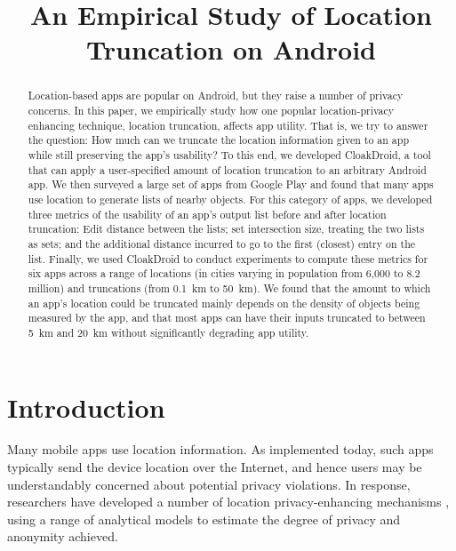\documentclass[10pt, conference, compsocconf]{IEEEtran}
\begin{document}
%

\title{An Empirical Study of Location Truncation on Android}
\author{
}

\maketitle

\begin{abstract}
  Location-based apps are popular on Android, but they raise a number
  of privacy concerns. In this paper, we empirically study how one
  popular location-privacy enhancing technique, location truncation,
  affects app utility. That is, we try to answer the question: How
  much can we truncate the location information given to an app while
  still preserving the app's usability? To this end, we developed
  CloakDroid, a tool that can apply a user-specified amount of
  location truncation to an arbitrary Android app. We then surveyed a
  large set of apps from Google Play and found that many apps use
  location to generate lists of nearby objects. For this category of
  apps, we developed three metrics of the usability of an app's output
  list before and after location truncation: Edit distance between the
  lists; set intersection size, treating the two lists as sets; and
  the additional distance incurred to go to the first (closest) entry
  on the list.  Finally, we used CloakDroid to conduct experiments to
  compute these metrics for six apps across a range of locations (in
  cities varying in population from 6,000 to 8.2 million) and
  truncations (from 0.1~km to 50~km).  We found that the amount to
  which an app's location could be truncated mainly depends on the
  density of objects being measured by the app, and that most apps can
  have their inputs truncated to between 5~km and 20~km without
  significantly degrading app utility.
\end{abstract}

\section{Introduction}
\label{sec:introduction}

Many mobile apps use
location information.
As implemented today, such apps typically send the device
location over the Internet, and hence users may be understandably
concerned about potential privacy violations. In response,
researchers have developed a number of location privacy-enhancing
mechanisms \cite{Beresford:2004, Shokri:2011, Shokri:2012,
Bettini:2005, Hoh:2005, Gruteser:2003},
 using a range of analytical models to estimate the degree of privacy 
and anonymity achieved.
\end{document}
